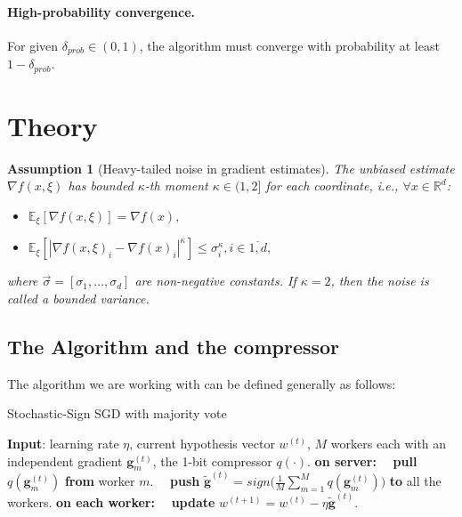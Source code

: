 \documentclass[12pt]{article}
\newcommand{\EE}{\mathbb{E}}
\newcommand{\R}{\mathbb{R}}
\newtheorem{assumption}{Assumption}
\begin{document}
\paragraph{High-probability convergence.}
For given $\delta_{prob} \in (0,1)$, the algorithm must converge with probability at least $1 - \delta_{prob}$.

\section{Theory}
\begin{assumption}[Heavy-tailed noise in gradient estimates]\label{as: pBCM}
    The unbiased estimate $\nabla f (x, \xi)$  has bounded $\kappa$-th moment $\kappa \in (1,2]$ for each coordinate, i.e., $\forall x \in \R^d$: 
    \begin{itemize}
        \item $\EE_\xi [\nabla f (x, \xi)] = \nabla f(x),$
        \item $\EE_\xi [|\nabla f (x, \xi)_i - \nabla f(x)_i|^\kappa] \leq \sigma_i^\kappa, i \in \overline{1,d},$
    \end{itemize}
    where $\Vec{\sigma} = [\sigma_1, \dots, \sigma_d]$ are non-negative constants.
    If $\kappa = 2$, then the noise is called a bounded variance. 
\end{assumption}

\subsection{The Algorithm and the compressor}
The algorithm we are working with can be defined generally as follows:
\begin{algorithm}
    \caption{Stochastic-Sign SGD with majority vote}
    \label{QuantizedSIGNSGD}
    \begin{algorithmic}
        \STATE \textbf{Input}: learning rate $\eta$, current hypothesis vector $w^{(t)}$, $M$ workers each with an independent gradient $\boldsymbol{g}_{m}^{(t)}$, the 1-bit compressor $q(\cdot)$.
        \STATE \textbf{on server:}
        \STATE ~~\textbf{pull} $q(\boldsymbol{g}_{m}^{(t)})$ \textbf{from} worker $m$.
        \STATE ~~\textbf{push} $\tilde{\boldsymbol{g}}^{(t)}= sign\big(\frac{1}{M}\sum_{m=1}^{M}q(\boldsymbol{g}_{m}^{(t)})\big)$ \textbf{to} all the workers.
        \STATE \textbf{on each worker:}
        \STATE ~~\textbf{update} $w^{(t+1)} = w^{(t)} - \eta\tilde{\boldsymbol{g}}^{(t)}$.
    \end{algorithmic}
\end{algorithm}    
\end{document}
